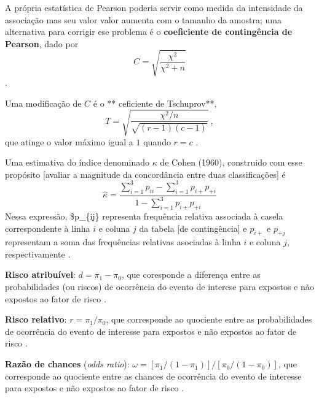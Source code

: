 \documentclass[
]{latex/krantz}
\renewenvironment{quote}{\begin{VF}}{\end{VF}}
\theoremstyle{definition}
\theoremstyle{definition}
\theoremstyle{definition}
\theoremstyle{definition}
\theoremstyle{remark}
\begin{document}
\begin{quote}
A própria estatística de Pearson poderia servir como medida da intensidade da associação mas seu valor valor aumenta com o tamanho da amostra; uma alternativa para corrigir ese problema é o \textbf{coeficiente de contingência de Pearson}, dado por \[C = \sqrt{\frac{\chi^2}{\chi^2 + n}}\] \citep[p.~83]{MorettinSinger2022}.
\end{quote}

\begin{quote}
Uma modificação de \(C\) é o ** ceficiente de Tschuprov**, \[ T = \sqrt{\frac{\chi^2/n}{\sqrt{(r - 1)(c - 1)}}} \ ,\] que atinge o valor máximo igual a \(1\) quando \(r = c\) \citep[p.~83]{MorettinSinger2022}.
\end{quote}

\begin{quote}
Uma estimativa do índice denominado \(\kappa\) de Cohen (1960), construido com esse propósito {[}avaliar a magnitude da concordância entre duas classificações{]} é \[\hat{\kappa} = \frac{\sum \limits_{i = 1}^{3}p_{ii} - \sum \limits_{i = 1}^{3}p_{i+}p_{+i}}{1 - \sum \limits_{i = 1}^{3}p_{i+}p_{+i}}\] Nessa expressão, \$p\_\{ij\} representa frequência relativa associada à casela correspondente à linha \(i\) e coluna \(j\) da tabela {[}de contingência{]} e \(p_{i+}\) e \(p_{+j}\) representam a soma das frequências relativas asociadas à linha \(i\) e coluna \(j\), respectivamente \citep[p.~85]{MorettinSinger2022}.
\end{quote}

\begin{quote}
\textbf{Risco atribuível}: \(d = \pi_1 - \pi_0\), que coresponde a diferença entre as probabilidades (ou riscos) de ocorrência do evento de interese para expostos e não expostos ao fator de risco \citep[p.~86]{MorettinSinger2022}.
\end{quote}

\begin{quote}
\textbf{Risco relativo}: \(r=\pi_{1}/\pi_{0}\), que corresponde ao quociente entre as probabilidades de ocorrência do evento de interesse para expostos e não expostos ao fator de risco \citep[p.~87]{MorettinSinger2022}.
\end{quote}

\begin{quote}
\textbf{Razão de chances} (\emph{odds ratio}): \(\omega=[\pi_{1}/(1-\pi_{1})]/[\pi_{0}/(1-\pi_{0})]\), que corresponde ao quociente entre as chances de ocorrência do evento de interesse para expostos e não expostos ao fator de risco \citep[p.~87]{MorettinSinger2022}.
\end{quote}
\end{document}
